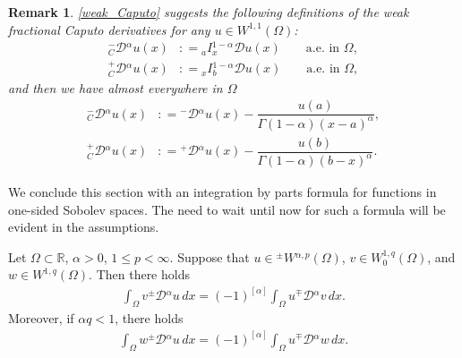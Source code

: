 \documentclass[leqno,final]{siamltex}
\numberwithin{equation}{section}
\newtheorem{remark}{Remark}[section]
\renewcommand{\(}{\bigl(}
\renewcommand{\)}{\bigr)}
\newcommand{\R}{\mathbb{R}}
\begin{document}
    \begin{remark}
    \eqref{weak_Caputo} suggests the following definitions of the weak fractional Caputo derivatives for any $u\in W^{1,1}(\Omega)$:
    \begin{align}\label{weak_Caputo_derivativeL}
    {^{-}_{C}}{\mathcal{D}}{^{\alpha}} u(x) &: = {_{a}}{I}{^{1-\alpha}_{x}} \mathcal{D}u(x) \qquad\mbox{a.e. in }  \Omega, \\
    {^{+}_{C}}{\mathcal{D}}{^{\alpha}} u(x) &: =  {_{x}}{I}{^{1-\alpha}_{b}} \mathcal{D}u(x) \qquad\mbox{a.e. in }  \Omega, \label{weak_Caputo_derivativeR}
    \end{align} 
    and then we have almost everywhere in $\Omega$
    \begin{align}\label{C1}
     {^{-}_{C}}{\mathcal{D}}{^{\alpha}} u (x)&: =  {^{-}}{\mathcal{D}}{^{\alpha}} u(x)  - \dfrac{u(a)  }{\Gamma(1-\alpha) (x-a)^{\alpha}},\\
      {^{+}_{C}}{\mathcal{D}}{^{\alpha}} u(x) &: = {^{+}}{\mathcal{D}}{^{\alpha}} u(x)   - \dfrac{u(b)  }{\Gamma(1-\alpha)(b-x)^{\alpha} }.  \label{C2}
    \end{align} 
    \end{remark}
    
    We conclude this section with an integration by parts formula for functions in one-sided Sobolev spaces. The need to wait until now for such a formula will be evident in the assumptions.
    
    \begin{proposition}
        Let $\Omega \subset \R$, $\alpha >0$, $1 \leq p < \infty$. Suppose that $u \in {^{\pm}}{W}{^{\alpha,p}}(\Omega)$, $v \in W^{1,q}_{0}(\Omega)$, and $w \in W^{1,q}(\Omega)$. Then there holds 
        \begin{align}\label{Sobolev0IBP}
            \int_{\Omega} v{^{\pm}}{\mathcal{D}}{^{\alpha}} u\, dx 
             = (-1)^{[\alpha]}\int_{\Omega} u {^{\mp}}{\mathcal{D}}{^{\alpha}}v \, dx. 
        \end{align}
        Moreover,  if $\alpha q < 1$, there holds
        \begin{align}\label{SobolevIBP}
            \int_{\Omega} w{^{\pm}}{\mathcal{D}}{^{\alpha}} u \,dx = (-1)^{[\alpha]} \int_{\Omega} u {^{\mp}}{\mathcal{D}}{^{\alpha}} w\, dx.
        \end{align}
    \end{proposition}
    
\end{document}
